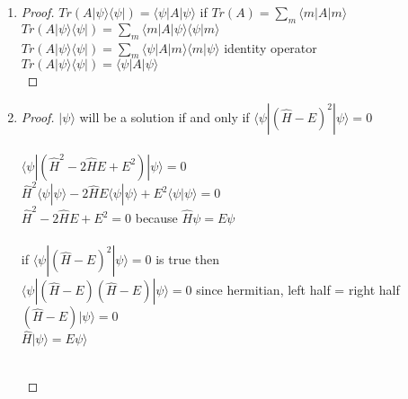 \documentclass{article}
\begin{document}
\begin{enumerate}
\begin{enumerate}
\begin{proof}
    \\ \end{proof}
    \item \begin{proof} $[x,F(p_x)]=-\frac{\hbar}{i}\frac{\partial}{\partial p_x}(F(p_x))$
    \\ turn position operator in momentum operator $\hat{x}=i\hbar\frac{\partial}{\partial p_x}$
    \\ $=i\hbar(\frac{\partial}{\partial p_x}F(p)\psi) - F(p)\frac{\partial}{\partial p_x}\psi$
    \\ $=i\hbar(\frac{\partial F(p)}{\partial p_x}\psi + F(p)\frac{\partial \psi}{\partial p_x} -  F(p)\frac{\partial \psi}{\partial p_x})$
    \\ $=i\hbar\frac{\partial F(p)}{\partial p_x}$
    \\ \end{proof}
    \end{enumerate}
\item \begin{proof} $Tr(A|\psi\rangle\langle\psi|)=\langle\psi|A|\psi\rangle$ if $Tr(A)=\sum_m\langle m|A|m\rangle$
\\ $Tr(A|\psi\rangle\langle\psi|)= \sum_m\langle m|A|\psi\rangle\langle\psi|m\rangle$
\\ $Tr(A|\psi\rangle\langle\psi|)= \sum_m\langle \psi|A|m\rangle\langle m|\psi\rangle$ identity operator
\\ $Tr(A|\psi\rangle\langle\psi|)=\langle\psi|A|\psi\rangle$
\\ \end{proof}
\item \begin{proof} $|\psi\rangle$ will be a solution if and only if $\langle \psi|(\hat{H}-E)^2|\psi\rangle=0$
\\ \Rightarrow
\\ $\langle \psi|(\hat{H}^2-2\hat{H}E+E^2)|\psi\rangle=0$
\\ $\hat{H}^2\langle\psi|\psi\rangle-2\hat{H}E\langle\psi|\psi\rangle+E^2\langle\psi|\psi\rangle=0$
\\ $\hat{H}^2-2\hat{H}E+E^2=0$ because $\hat{H}\psi=E\psi$
\\ \Leftarrow
\\ if $\langle \psi|(\hat{H}-E)^2|\psi\rangle=0$ is true then
\\ $\langle \psi|(\hat{H}-E)(\hat{H}-E)|\psi\rangle=0$ since hermitian, left half = right half
\\ $(\hat{H}-E)|\psi\rangle=0$
\\ $\hat{H}|\psi\rangle=E\psi\rangle$

\\ \end{proof}
\end{enumerate}%
\end{document}
